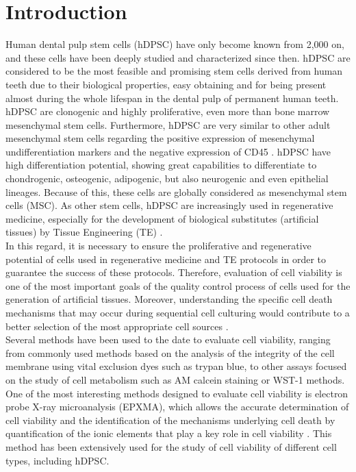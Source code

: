 \documentclass[a4paper,12pt]{article}
\begin{document}
\twocolumn
\section{Introduction}
Human dental pulp stem cells (hDPSC) have only become known from 2,000 on, and these cells have been deeply studied and characterized since then. hDPSC are considered to be the most feasible and promising stem cells derived from human teeth due to their biological properties, easy obtaining and for being present almost during the whole lifespan in the dental pulp of permanent human teeth. hDPSC are clonogenic and highly proliferative, even more than bone marrow mesenchymal stem cells. Furthermore, hDPSC are very similar to other adult mesenchymal stem cells regarding the positive expression of mesenchymal undifferentiation markers and the negative expression of CD45 \cite{RN1229}. hDPSC have high differentiation potential, showing great capabilities to differentiate to chondrogenic, osteogenic, adipogenic, but also neurogenic and even epithelial lineages. Because of this, these cells are globally considered as mesenchymal stem cells (MSC). As other stem cells, hDPSC are increasingly used in regenerative medicine, especially for the development of biological substitutes (artificial tissues) by Tissue Engineering (TE) \cite{RN1058}.\\
In this regard, it is necessary to ensure the proliferative and regenerative potential of cells used in regenerative medicine and TE protocols in order to guarantee the success of these protocols. Therefore, evaluation of cell viability is one of the most important goals of the quality control process of cells used for the generation of artificial tissues. Moreover, understanding the specific cell death mechanisms that may occur during sequential cell culturing would contribute to a better selection of the most appropriate cell sources \cite{RN287}.\\
Several methods have been used to the date to evaluate cell viability, ranging from commonly used methods based on the analysis of the integrity of the cell membrane using vital exclusion dyes such as trypan blue, to other assays focused on the study of cell metabolism such as AM calcein staining or WST-1 methods. One of the most interesting methods designed to evaluate cell viability is electron probe X-ray microanalysis (EPXMA), which allows the accurate determination of cell viability and the identification of the mechanisms underlying cell death by quantification of the ionic elements that play a key role in cell viability \cite{RN231}. This method has been extensively used for the study of cell viability of different cell types, including hDPSC. \cite{RN244}\\
\end{document}
